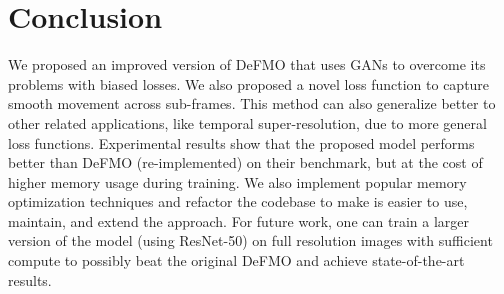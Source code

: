 \section{Conclusion}

We proposed an improved version of DeFMO that uses GANs to overcome its problems with biased losses.
We also proposed a novel loss function to capture smooth movement across sub-frames.
This method can also generalize better to other related applications, like temporal super-resolution, due to more general loss functions.
Experimental results show that the proposed model performs better than DeFMO (re-implemented) on their benchmark, but at the cost of higher memory usage during training.
We also implement popular memory optimization techniques and refactor the codebase to make is easier to use, maintain, and extend the approach.
For future work, one can train a larger version of the model (using ResNet-50) on full resolution images with sufficient compute to possibly beat the original DeFMO and achieve state-of-the-art results.
